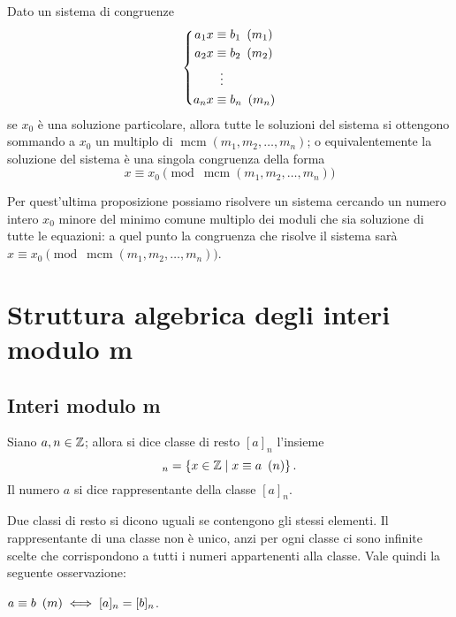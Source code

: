 \begin{proposition}
    Dato un sistema di congruenze 
    \begin{equation*}
        \left\{
        \begin{alignedat}{1}
            a_1x &\equiv b_1 \Mod{m_1}\\
            a_2x &\equiv b_2 \Mod{m_2}\\
            &\vdotswithin{\equiv} \\
            a_nx &\equiv b_n \Mod{m_n}
        \end{alignedat}      
        \right . 
    \end{equation*}
    se $x_0$ è una soluzione particolare, allora tutte le soluzioni del sistema si ottengono sommando a $x_0$ un multiplo di $\operatorname{mcm}(m_1, m_2, \dots, m_n)$; o equivalentemente la soluzione del sistema è una singola congruenza della forma
    \begin{equation}
        x \equiv x_0 \pmod{\operatorname{mcm}(m_1, m_2, \dots, m_n)}
    \end{equation}
\end{proposition}

Per quest'ultima proposizione possiamo risolvere un sistema cercando un numero intero $x_0$ minore del minimo comune multiplo dei moduli che sia soluzione di tutte le equazioni: a quel punto la congruenza che risolve il sistema sarà $x \equiv x_0 \pmod{\operatorname{mcm}(m_1, m_2, \dots, m_n)}$.

\section{Struttura algebrica degli interi modulo m}

\subsection{Interi modulo m}

\begin{definition}
    Siano $a, n \in \mathbb{Z}$; allora si dice classe di resto $[a]_n$ l'insieme 
    \begin{equation}
        [a]_n = \left\{x \in \Z \mid x \equiv a \Mod{n}\right\}.
    \end{equation}
    Il numero $a$ si dice rappresentante della classe $[a]_n$.
\end{definition}

Due classi di resto si dicono uguali se contengono gli stessi elementi.
Il rappresentante di una classe non è unico, anzi per ogni classe ci sono infinite scelte che corrispondono a tutti i numeri appartenenti alla classe. Vale quindi la seguente osservazione:
\begin{remark}
    $a \equiv b \ \left(m\right) \iff [a]_n = [b]_n$.
\end{remark}

